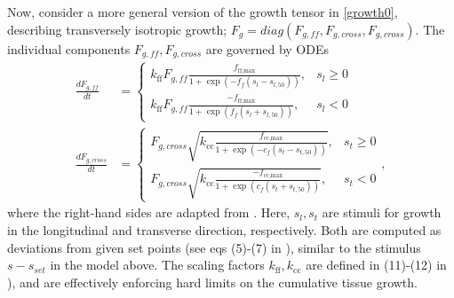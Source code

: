 \documentclass[a4paper,10pt]{article}
\begin{document}
Now, consider a more general version of the growth tensor in \eqref{growth0}, describing transversely isotropic
growth; $F_{g}= diag(F_{g,ff}, F_{g,cross}, F_{g,cross})$. 
The individual components $F_{g,ff}, F_{g,cross}$ are governed by ODEs
\begin{align}
  \frac{d F_{g,ff}}{dt} &= \begin{cases}
    k_\text{ff} F_{g,ff} \frac{f_\text{ff,max}}{1 + \exp(-f_f(s_l - s_{l,50}))}, & s_l \geq 0 \\
    k_\text{ff} F_{g,ff} \frac{-f_\text{ff,max}}{1 + \exp(f_f(s_l + s_{l,50}))}, & s_l < 0
    \end{cases} \label{kerckhoffs_ode0}\\
    \frac{d F_{g,cross}}{dt} &=
\begin{cases}
  F_{g,cross} \sqrt{k_\text{cc}\frac{f_\text{cc,max} }{1 + \exp(-c_f(s_t - s_{t,50}))}}, & s_t \geq 0 \\
  F_{g,cross} \sqrt{k_\text{cc} \frac{-f_\text{cc,max}}{1 + \exp(c_f(s_t + s_{t,50}))}}, & s_t < 0
\end{cases}, \label{kerckhoffs_ode1}
\end{align}
where the right-hand sides are adapted from \cite{Kerckhoffs2012MRC}.
Here, $s_l, s_t$ are
stimuli for growth in the longitudinal and transverse direction, respectively. Both are computed
as deviations from given set points (see eqs (5)-(7) in \cite{Kerckhoffs2012MRC}), similar to the 
stimulus $s-s_{set}$ in the model above. The scaling factors
$k_\text{ff},k_\text{cc}$ are defined in (11)-(12) in \cite{Kerckhoffs2012MRC}), and are effectively 
enforcing hard limits on the cumulative tissue growth. 
\end{document}
